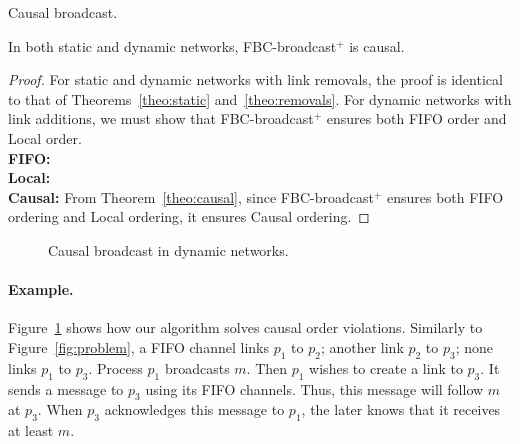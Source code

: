 \begin{algorithm}[h]
  
  \caption{\label{algo:bufferbroadcast}Causal broadcast.}
\end{algorithm}


\begin{theorem}
  In both static and dynamic networks, FBC-broadcast$^+$ is causal.
\end{theorem}

\begin{proof}
  For static and dynamic networks with link removals, the proof is identical to
  that of Theorems~\ref{theo:static} and~\ref{theo:removals}. For dynamic
  networks with link additions, we must show that FBC-broadcast$^+$ ensures both
  FIFO order and Local order. \\
  \textbf{FIFO:}  \\
  \textbf{Local:}  \\
  \textbf{Causal:} From Theorem~\ref{theo:causal}, since FBC-broadcast$^+$
  ensures both FIFO ordering and Local ordering, it ensures Causal ordering.
\end{proof}

\begin{figure}
  \begin{center}
    
    \caption{\label{fig:solved}Causal broadcast in dynamic networks.}
  \end{center}
\end{figure}

\paragraph{Example.} Figure~\ref{fig:solved} shows how our algorithm solves
causal order violations. Similarly to Figure~\ref{fig:problem}, a FIFO channel
links $p_1$ to $p_2$; another link $p_2$ to $p_3$; none links $p_1$ to
$p_3$. Process $p_1$ broadcasts $m$. Then $p_1$ wishes to create a link to
$p_3$. It sends a message to $p_3$ using its FIFO channels. Thus, this message
will follow $m$ at $p_3$. When $p_3$ acknowledges this message to $p_1$, the
later knows that it receives at least $m$. 

